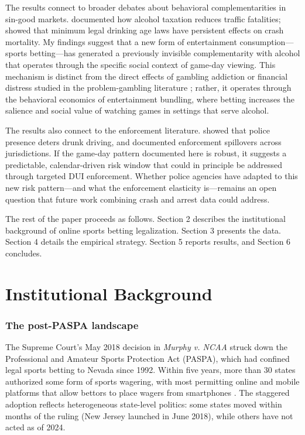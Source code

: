 \documentclass[12pt]{article}
\begin{document}
The results connect to broader debates about behavioral complementarities in sin-good markets. \citet{CookMoore1993} documented how alcohol taxation reduces traffic fatalities; \citet{CarpenterDobkin2011} showed that minimum legal drinking age laws have persistent effects on crash mortality. My findings suggest that a new form of entertainment consumption---sports betting---has generated a previously invisible complementarity with alcohol that operates through the specific social context of game-day viewing. This mechanism is distinct from the direct effects of gambling addiction or financial distress studied in the problem-gambling literature \citep{Grinols2004, WalkerBarnett1999}; rather, it operates through the behavioral economics of entertainment bundling, where betting increases the salience and social value of watching games in settings that serve alcohol.

The results also connect to the enforcement literature. \citet{DeAngelo2017} showed that police presence deters drunk driving, and \citet{HansenWaddell2018} documented enforcement spillovers across jurisdictions. If the game-day pattern documented here is robust, it suggests a predictable, calendar-driven risk window that could in principle be addressed through targeted DUI enforcement. Whether police agencies have adapted to this new risk pattern---and what the enforcement elasticity is---remains an open question that future work combining crash and arrest data could address.

The rest of the paper proceeds as follows. Section 2 describes the institutional background of online sports betting legalization. Section 3 presents the data. Section 4 details the empirical strategy. Section 5 reports results, and Section 6 concludes.

\section{Institutional Background}

\subsubsection*{The post-PASPA landscape} The Supreme Court's May 2018 decision in \textit{Murphy v. NCAA} struck down the Professional and Amateur Sports Protection Act (PASPA), which had confined legal sports betting to Nevada since 1992. Within five years, more than 30 states authorized some form of sports wagering, with most permitting online and mobile platforms that allow bettors to place wagers from smartphones \citep{AGA2023}. The staggered adoption reflects heterogeneous state-level politics: some states moved within months of the ruling (New Jersey launched in June 2018), while others have not acted as of 2024.
\end{document}
